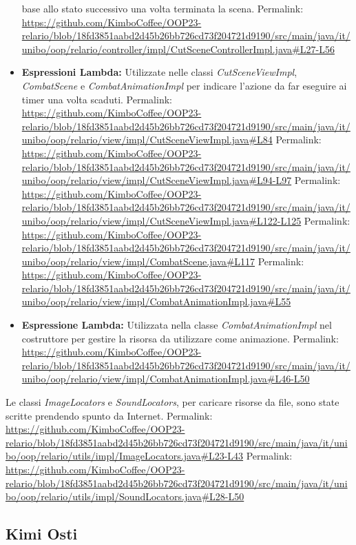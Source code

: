 \documentclass[a4paper,12pt]{report}
\begin{document}
\begin{itemize}
	base allo stato successivo una volta terminata la scena.
	Permalink: \url{https://github.com/KimboCoffee/OOP23-relario/blob/18fd3851aabd2d45b26bb726cd73f204721d9190/src/main/java/it/unibo/oop/relario/controller/impl/CutSceneControllerImpl.java#L27-L56}
	\item \textbf{Espressioni Lambda:} Utilizzate nelle classi \textit{CutSceneViewImpl}, \textit{CombatScene} e \textit{CombatAnimationImpl} per indicare l'azione da far eseguire ai timer una volta scaduti.
	Permalink: \url{https://github.com/KimboCoffee/OOP23-relario/blob/18fd3851aabd2d45b26bb726cd73f204721d9190/src/main/java/it/unibo/oop/relario/view/impl/CutSceneViewImpl.java#L84}
	Permalink: \url{https://github.com/KimboCoffee/OOP23-relario/blob/18fd3851aabd2d45b26bb726cd73f204721d9190/src/main/java/it/unibo/oop/relario/view/impl/CutSceneViewImpl.java#L94-L97}
	Permalink: \url{https://github.com/KimboCoffee/OOP23-relario/blob/18fd3851aabd2d45b26bb726cd73f204721d9190/src/main/java/it/unibo/oop/relario/view/impl/CutSceneViewImpl.java#L122-L125}
	Permalink: \url{https://github.com/KimboCoffee/OOP23-relario/blob/18fd3851aabd2d45b26bb726cd73f204721d9190/src/main/java/it/unibo/oop/relario/view/impl/CombatScene.java#L117}
	Permalink: \url{https://github.com/KimboCoffee/OOP23-relario/blob/18fd3851aabd2d45b26bb726cd73f204721d9190/src/main/java/it/unibo/oop/relario/view/impl/CombatAnimationImpl.java#L55}
	\item \textbf{Espressione Lambda:} Utilizzata nella classe \textit{CombatAnimationImpl} nel costruttore per gestire la risorsa da utilizzare come animazione.
	Permalink: \url{https://github.com/KimboCoffee/OOP23-relario/blob/18fd3851aabd2d45b26bb726cd73f204721d9190/src/main/java/it/unibo/oop/relario/view/impl/CombatAnimationImpl.java#L46-L50}
\end{itemize}

Le classi \textit{ImageLocators} e \textit{SoundLocators}, per caricare risorse da file, sono state scritte prendendo spunto da Internet.
Permalink: \url{https://github.com/KimboCoffee/OOP23-relario/blob/18fd3851aabd2d45b26bb726cd73f204721d9190/src/main/java/it/unibo/oop/relario/utils/impl/ImageLocators.java#L23-L43}
Permalink: \url{https://github.com/KimboCoffee/OOP23-relario/blob/18fd3851aabd2d45b26bb726cd73f204721d9190/src/main/java/it/unibo/oop/relario/utils/impl/SoundLocators.java#L28-L50}

\subsection{Kimi Osti}
\end{document}
